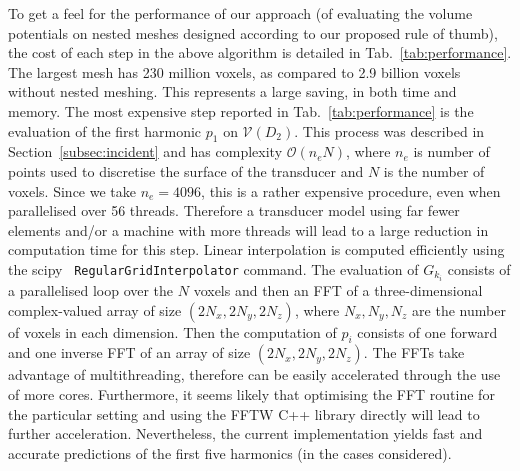 \documentclass[preprint]{JASA}
\begin{document}
To get a feel for the performance of our approach (of evaluating the volume potentials
on nested meshes designed according to our proposed rule of thumb), the cost of each 
step in the above algorithm is detailed in Tab.~\ref{tab:performance}. The 
largest mesh has 230 million voxels, as compared to 2.9 billion voxels without 
nested meshing. This represents a large saving, in both time and memory. The 
most expensive step reported in Tab.~\ref{tab:performance} is the evaluation of 
the first harmonic $p_1$ on $\mathcal{V}(D_2)$. This process was described in 
Section~\ref{subsec:incident} and has complexity $\mathcal{O}(n_e N)$, where $n_e$ is 
number of points used to discretise the surface of the transducer and $N$ is the 
number of voxels.
Since we take $n_e=4096$, this is a rather expensive procedure, even when parallelised
over 56 threads. Therefore a transducer model using far fewer elements and/or a machine
with more threads will lead to a large reduction in computation time for this step.
Linear interpolation is computed efficiently using the scipy~\cite{jones2001scipy} \verb!RegularGridInterpolator!
command. The evaluation of $G_{k_i}$ consists of a parallelised loop over the 
$N$ voxels and then an FFT of a three-dimensional complex-valued array of size $(2N_x,2N_y,2N_z)$,
where $N_x,N_y,N_z$ are the number of voxels in each dimension. Then the computation
of $p_i$ consists of one forward and one inverse FFT of an array of size $(2N_x,2N_y,2N_z)$.
The FFTs take advantage of multithreading, therefore can be easily accelerated 
through the use of more cores. Furthermore, it seems likely that optimising the 
FFT routine for the particular setting and using the FFTW C++ library directly 
will lead to further acceleration. Nevertheless, the current implementation yields fast and accurate predictions of 
the first five harmonics (in the cases considered).
\end{document}
